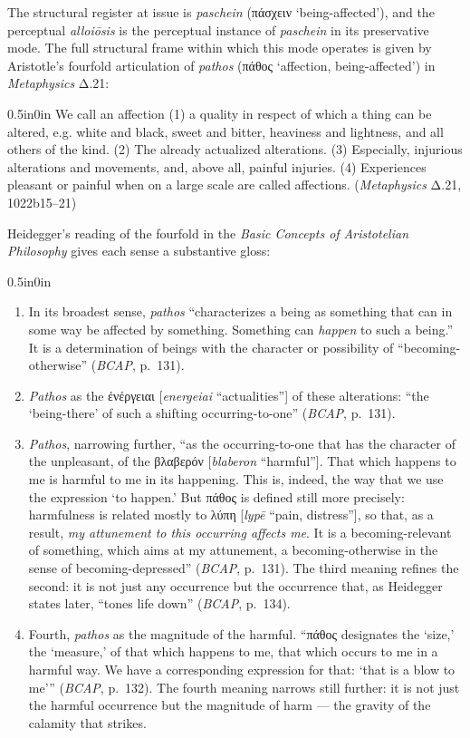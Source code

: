 \documentclass{article}
\newcommand{\gk}[1]{{\greekfont #1}}
\begin{document}
The structural register at issue is \textit{paschein} (\gk{πάσχειν} `being-affected'), and the perceptual \textit{alloiōsis} is the perceptual instance of \textit{paschein} in its preservative mode. The full structural frame within which this mode operates is given by Aristotle's fourfold articulation of \textit{pathos} (\gk{πάθος} `affection, being-affected') in \textit{Metaphysics} Δ.21:
\begin{adjustwidth}{0.5in}{0in}
We call an affection (1) a quality in respect of which a thing can be altered, e.g. white and black, sweet and bitter, heaviness and lightness, and all others of the kind. (2) The already actualized alterations. (3) Especially, injurious alterations and movements, and, above all, painful injuries. (4) Experiences pleasant or painful when on a large scale are called affections. (\textit{Metaphysics} Δ.21, 1022b15--21)
\end{adjustwidth}
Heidegger's reading of the fourfold in the \textit{Basic Concepts of Aristotelian Philosophy} gives each sense a substantive gloss:
\begin{adjustwidth}{0.5in}{0in}
    \begin{enumerate}
        \item In its broadest sense, \textit{pathos} ``characterizes a being as something that can in some way be affected by something. Something can \textit{happen} to such a being.'' It is a determination of beings with the character or possibility of ``becoming-otherwise'' (\textit{BCAP}, p.~131).
        \item \textit{Pathos} as the \gk{ἐνέργειαι} [\textit{energeiai} ``actualities''] of these alterations: ``the `being-there' of such a shifting occurring-to-one'' (\textit{BCAP}, p.~131).
        \item \textit{Pathos}, narrowing further, ``as the occurring-to-one that has the character of the unpleasant, of the \gk{βλαβερόν} [\textit{blaberon} ``harmful'']. That which happens to me is harmful to me in its happening. This is, indeed, the way that we use the expression `to happen.' But \gk{πάθος} is defined still more precisely: harmfulness is related mostly to \gk{λύπη} [\textit{lypē} ``pain, distress''], so that, as a result, \textit{my attunement to this occurring affects me}. It is a becoming-relevant of something, which aims at my attunement, a becoming-otherwise in the sense of becoming-depressed'' (\textit{BCAP}, p.~131). The third meaning refines the second: it is not just any occurrence but the occurrence that, as Heidegger states later, ``tones life down'' (\textit{BCAP}, p.~134).
        \item Fourth, \textit{pathos} as the magnitude of the harmful. ``\gk{πάθος} designates the `size,' the `measure,' of that which happens to me, that which occurs to me in a harmful way. We have a corresponding expression for that: `that is a blow to me''' (\textit{BCAP}, p.~132). The fourth meaning narrows still further: it is not just the harmful occurrence but the magnitude of harm --- the gravity of the calamity that strikes.
    \end{enumerate}
\end{adjustwidth}
\end{document}

